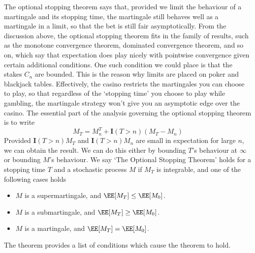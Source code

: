 The optional stopping theorem says that, provided we limit the behaviour of a martingale and its stopping time, the martingale still behaves well as a martingale in a limit, so that the bet is still fair asymptotically. From the discussion above, the optional stopping theorem fits in the family of results, such as the monotone convergence theorem, dominated convergence theorem, and so on, which say that expectation does play nicely with pointwise convergence given certain additional conditions. One such condition we could place is that the stakes $C_n$ are bounded. This is the reason why limits are placed on poker and blackjack tables. Effectively, the casino restricts the martingales you can choose to play, so that regardless of the `stopping time' you choose to play while gambling, the martingale strategy won't give you an asymptotic edge over the casino. The essential part of the analysis governing the optional stopping theorem is to write
%
\[ M_T = M^T_n + \mathbf{I}(T > n) (M_T - M_n) \]
%
Provided $\mathbf{I}(T > n) M_T$ and $\mathbf{I}(T > n) M_n$ are small in expectation for large $n$, we can obtain the result. We can do this either by bounding $T$'s behaviour at $\infty$ or bounding $M$'s behaviour. We say `The Optional Stopping Theorem' holds for a stopping time $T$ and a stochastic process $M$ if $M_T$ is integrable, and one of the following cases holds
%
\begin{itemize}
    \item $M$ is a supermartingale, and $\EE[M_T] \leq \EE[M_0]$.
    \item $M$ is a submartingale, and $\EE[M_T] \geq \EE[M_0]$.
    \item $M$ is a martingale, and $\EE[M_T] = \EE[M_0]$.
\end{itemize}
%
The theorem provides a list of conditions which cause the theorem to hold.

